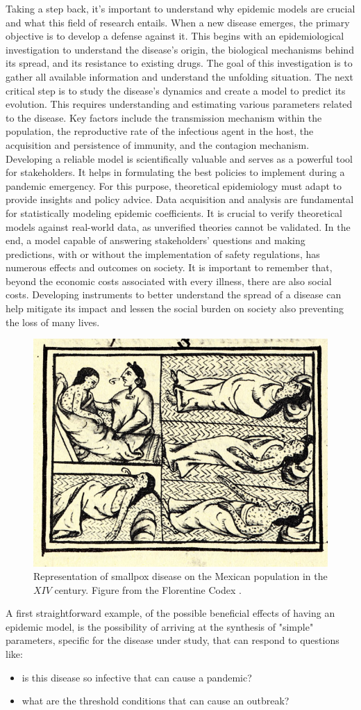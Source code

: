 Taking a step back, it's important to understand why epidemic models are crucial and what this field of research entails.
When a new disease emerges, the primary objective is to develop a defense against it. This begins with an epidemiological investigation to understand the disease's origin, the biological mechanisms behind its spread, and its resistance to existing drugs. The goal of this investigation is to gather all available information and understand the unfolding situation.
The next critical step is to study the disease's dynamics and create a model to predict its evolution. This requires understanding and estimating various parameters related to the disease. Key factors include the transmission mechanism within the population, the reproductive rate of the infectious agent in the host, the acquisition and persistence of immunity, and the contagion mechanism.
Developing a reliable model is scientifically valuable and serves as a powerful tool for stakeholders. It helps in formulating the best policies to implement during a pandemic emergency. For this purpose, theoretical epidemiology must adapt to provide insights and policy advice. Data acquisition and analysis are fundamental for statistically modeling epidemic coefficients. It is crucial to verify theoretical models against real-world data, as unverified theories cannot be validated.
In the end, a model capable of answering stakeholders' questions and making predictions, with or without the implementation of safety regulations, has numerous effects and outcomes on society. It is important to remember that, beyond the economic costs associated with every illness, there are also social costs. Developing instruments to better understand the spread of a disease can help mitigate its impact and lessen the social burden on society also preventing the loss of many lives.

\begin{figure}[]
	\centering
	\includegraphics[width=0.4\linewidth]{0_introduction/images_introduction/FlorentineCodex_smallpox}
	\caption[smallpox on native Americans]{Representation of smallpox disease on the Mexican population in the $XIV$ century. Figure from the Florentine Codex \cite{Sahagun1965}. }
	\label{fig:florentinecodexsmallpox}
\end{figure}
A first straightforward example, of the possible beneficial effects of having an epidemic model, is the possibility of arriving at the synthesis of "simple" parameters, specific for the disease under study, that can respond to questions like:
\begin{itemize}
	\item is this disease so infective that can cause a pandemic?
	\item what are the threshold conditions that can cause an outbreak? 
\end{itemize}

